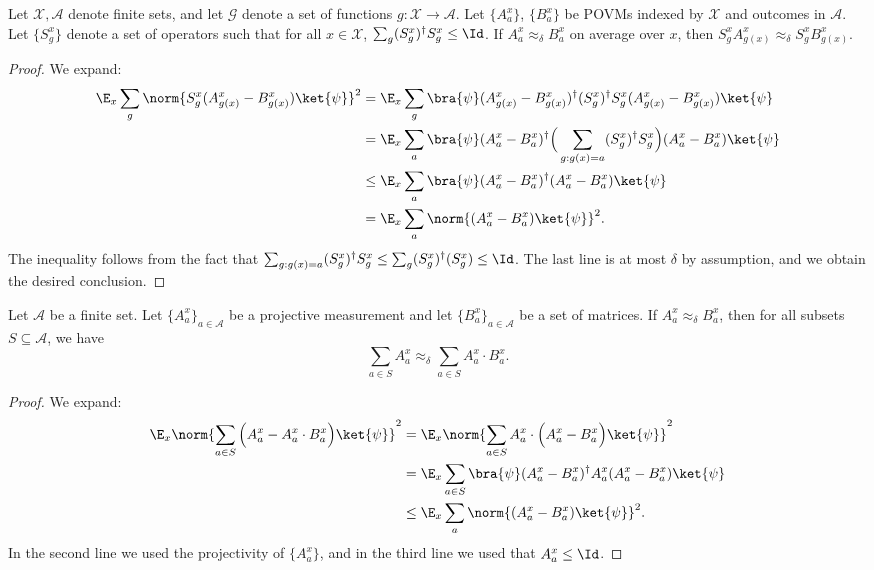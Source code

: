 \begin{fact}
\hypertarget{000V}{}
\reversemarginpar{}
\label{fact:add-a-proj2}
Let $\mathcal{X},\mathcal{A}$ denote finite sets, and let $\mathcal{G}$ denote a set of functions $g: \mathcal{X} \to \mathcal{A}$. Let $\{A^x_a \}$, $\{B^x_a\}$ be POVMs indexed by $\mathcal{X}$ and outcomes in $\mathcal{A}$. Let $\{ S_g^x \}$ denote a set of operators such that for all $x \in \mathcal{X}$, $\sum_g (S_g^x)^\dagger S_g^x \leq \Id$. 
If $A^x_a \approx_\delta B^x_a$ on average over $x$, then $S_g^x A^x_{g(x)} \approx_\delta S_g^x B^x_{g(x)}$. 
\end{fact}
\begin{proof}
	We expand:
	\begin{align*}
		\E_x \sum_g \norm{ S^x_g (A^x_{g(x)} - B^x_{g(x)}) \ket{\psi}}^2 &= \E_x \sum_g \bra{\psi} (A^x_{g(x)} - B^x_{g(x)})^\dagger  (S_g^x)^\dagger S_g^x (A^x_{g(x)} - B^x_{g(x)}) \ket{\psi} \\
		&= \E_x \sum_a \bra{\psi} (A^x_a - B^x_a)^\dagger  \Big(\sum_{g: g(x) = a} (S_g^x)^\dagger S_g^x \Big) (A^x_a - B^x_a) \ket{\psi} \\
		&\leq \E_x \sum_a \bra{\psi} (A^x_a - B^x_a)^\dagger (A^x_a - B^x_a) \ket{\psi} \\
		&= \E_x \sum_a \norm{ (A^x_a - B^x_a) \ket{\psi} }^2.
	\end{align*}
	The inequality follows from the fact that $\sum_{g: g(x) = a} (S_g^x)^\dagger S_g^x \leq \sum_g (S_g^x)^\dagger (S_g^x) \leq \Id$. The last line is at most $\delta$ by assumption, and we obtain the desired conclusion.
\end{proof}


\begin{lemma}
\hypertarget{000W}{}
\reversemarginpar{}
\label{lem:cool-closeness-fact}
Let $\mathcal{A}$ be a finite set. Let $\{A^x_a\}_{a \in \mathcal{A}}$ be a projective measurement and let $\{B^x_a\}_{a \in \mathcal{A}}$ be a set of matrices. If $A^x_a \approx_\delta B^x_a$, then for all subsets $S \subseteq \mathcal{A}$, we have
\[
	\sum_{a \in S} A^x_a \approx_\delta \sum_{a \in S} A^x_a \cdot B^x_a.
\]
\end{lemma}
\begin{proof}
We expand:
\begin{align*}
	\E_x \norm{ \sum_{a \in S} \Big(A^x_a - A^x_a \cdot B^x_a\Big) \ket{\psi}}^2 &= \E_x \norm{ \sum_{a \in S} A^x_a \cdot \Big(A^x_a - B^x_a\Big) \ket{\psi}}^2 \\
	&= \E_x \sum_{a \in S} \bra{\psi} (A^x_a - B^x_a)^\dagger A^x_a (A^x_a - B^x_a) \ket{\psi} \\
	&\leq \E_x \sum_a \norm{ (A^x_a -  B^x_a) \ket{\psi}}^2.
\end{align*}
In the second line we used the projectivity of $\{ A^x_a \}$, and in the third line we used that $A^x_a \leq \Id$.
\end{proof}


